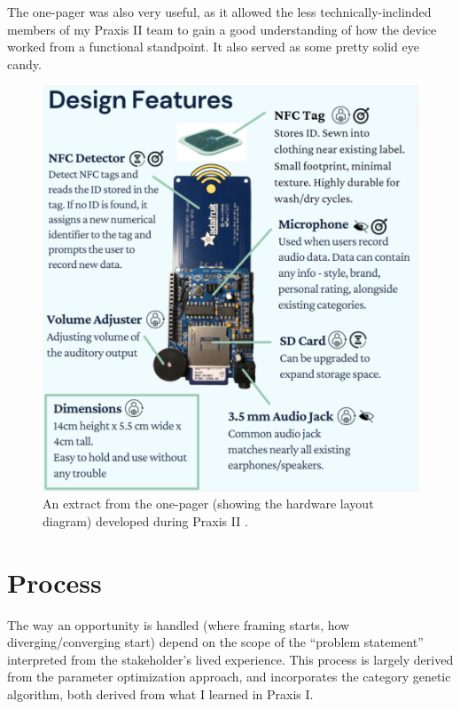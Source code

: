\documentclass{report}
\begin{document}
The one-pager was also very useful, as it allowed the less technically-inclinded
members of my Praxis II team to gain a good understanding of how the device worked
from a functional standpoint. It also served as some pretty solid eye candy.

\begin{figure}[h]
    \centering
    \includegraphics[width=\textwidth/2]{images/hardware.png}
    \hfill
    \caption{An extract from the one-pager (showing the hardware layout diagram) developed during Praxis II \cite{hardware}.}
\end{figure}

\pagebreak

\section{Process}
The way an opportunity is handled (where framing starts, how diverging/converging 
start) depend on the scope of the “problem statement” interpreted from the 
stakeholder’s lived experience. This process is largely derived from the 
parameter optimization approach, and incorporates the category genetic algorithm, 
both derived from what I learned in Praxis I.
\end{document}
